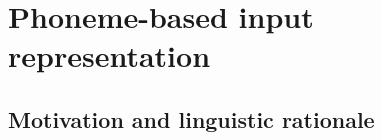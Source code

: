 



\section{Phoneme-based input representation}\label{sec:12-phonemic}

\subsection{Motivation and linguistic rationale}

